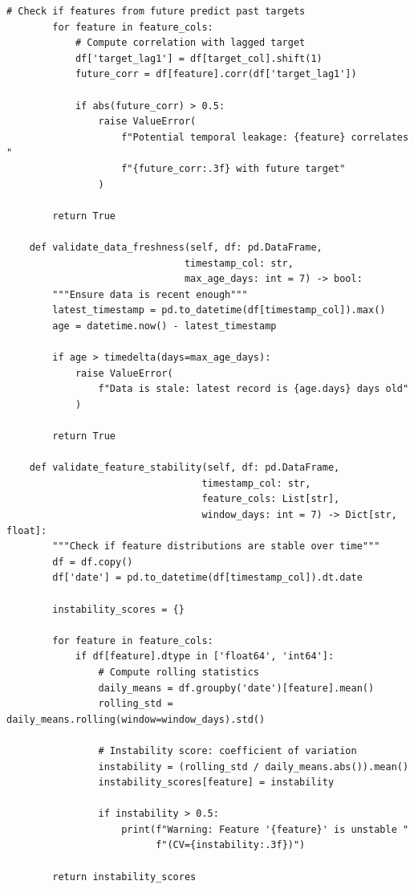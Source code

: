 \begin{lstlisting}[style=python, caption=Custom validation rules for ML data]
        # Check if features from future predict past targets
        for feature in feature_cols:
            # Compute correlation with lagged target
            df['target_lag1'] = df[target_col].shift(1)
            future_corr = df[feature].corr(df['target_lag1'])

            if abs(future_corr) > 0.5:
                raise ValueError(
                    f"Potential temporal leakage: {feature} correlates "
                    f"{future_corr:.3f} with future target"
                )

        return True

    def validate_data_freshness(self, df: pd.DataFrame,
                               timestamp_col: str,
                               max_age_days: int = 7) -> bool:
        """Ensure data is recent enough"""
        latest_timestamp = pd.to_datetime(df[timestamp_col]).max()
        age = datetime.now() - latest_timestamp

        if age > timedelta(days=max_age_days):
            raise ValueError(
                f"Data is stale: latest record is {age.days} days old"
            )

        return True

    def validate_feature_stability(self, df: pd.DataFrame,
                                  timestamp_col: str,
                                  feature_cols: List[str],
                                  window_days: int = 7) -> Dict[str, float]:
        """Check if feature distributions are stable over time"""
        df = df.copy()
        df['date'] = pd.to_datetime(df[timestamp_col]).dt.date

        instability_scores = {}

        for feature in feature_cols:
            if df[feature].dtype in ['float64', 'int64']:
                # Compute rolling statistics
                daily_means = df.groupby('date')[feature].mean()
                rolling_std = daily_means.rolling(window=window_days).std()

                # Instability score: coefficient of variation
                instability = (rolling_std / daily_means.abs()).mean()
                instability_scores[feature] = instability

                if instability > 0.5:
                    print(f"Warning: Feature '{feature}' is unstable "
                          f"(CV={instability:.3f})")

        return instability_scores
\end{lstlisting}

